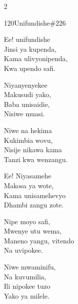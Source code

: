 \begin{multicols}{2}
\begin{hymn}{120}{Unifundishe}{\#226}
\begin{stanza}
Ee! unifundishe\\
Jinsi ya kupenda,\\
Kama ulivyonipenda,\\
Kwa upendo safi.
\end{stanza}
\begin{stanza}
Niyanyenyekee\\
Makusudi yako,\\
Baba unisaidie,\\
Nisiwe muasi.
\end{stanza}
\begin{stanza}
Niwe na hekima\\
Kukimbia wovu,\\
Nisije nikawa kama\\
Tanzi kwa wenzangu.
\end{stanza}
\begin{stanza}
Ee! Niyasamehe\\
Makosa ya wote,\\
Kama unisamehevyo\\
Dhambi zangu zote.
\end{stanza}
\begin{stanza}
Nipe moyo safi,\\
Mwenye utu wema,\\
Maneno yangu, vitendo\\
Na uvipokee.
\end{stanza}
\begin{stanza}
Niwe mwaminifu,\\
Na kuvumilia,\\
Ili nipokee tuzo\\
Yako ya milele.
\end{stanza}
\end{hymn}


\end{multicols}
